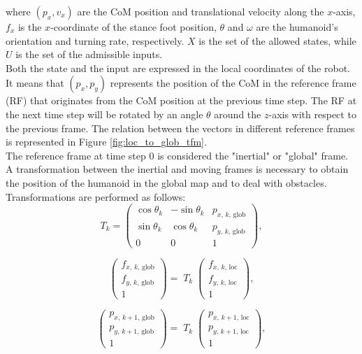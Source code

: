 \documentclass[main.tex]{subfiles}
\begin{document}
where $(p_x, v_x)$ are the CoM position and translational velocity along the $x$-axis, $f_x$ is the $x$-coordinate of the stance foot position, $\theta$ and $\omega$ are the humanoid's orientation and turning rate, respectively. $X$ is the set of the allowed states, while $U$ is the set of the admissible inputs.\\
Both the state and the input are expressed in the local coordinates of the robot. It means that $(p_x, p_y)$ represents the position of the CoM in the reference frame (RF) that originates from the CoM position at the previous time step. The RF at the next time step will be rotated by an angle $\theta$ around the $z$-axis with respect to the previous frame. The relation between the vectors in different reference frames is represented in Figure \ref{fig:loc_to_glob_tfm}.\\
The reference frame at time step 0 is considered the "inertial" or "global" frame. A transformation between the inertial and moving frames is necessary to obtain the position of the humanoid in the global map and to deal with obstacles. Transformations are performed as follows:
$$
T_k = \begin{pmatrix}
\cos\theta_k & -\sin\theta_k & p_{x,\,k,\,\text{glob}} \\
\sin\theta_k & \cos\theta_k &  p_{y,\,k,\,\text{glob}} \\
0 & 0 & 1
\end{pmatrix},
$$

$$
\begin{pmatrix} f_{x,\,k,\,\text{glob} } \\ f_{y,\,k,\,\text{glob}} \\ 1 \end{pmatrix} = \; T_k \;
\begin{pmatrix}
f_{x,\,k,\,\text{loc} } \\ f_{y,\,k,\,\text{loc}} \\ 1
\end{pmatrix},
$$

$$
\begin{pmatrix} p_{x,\,k+1,\,\text{glob} } \\ p_{y,\,k+1,\,\text{glob}} \\ 1 \end{pmatrix} = \; T_k \;
\begin{pmatrix}
p_{x,\,k+1,\,\text{loc} } \\ p_{y,\,k+1,\,\text{loc}} \\ 1
\end{pmatrix},
$$
\end{document}

